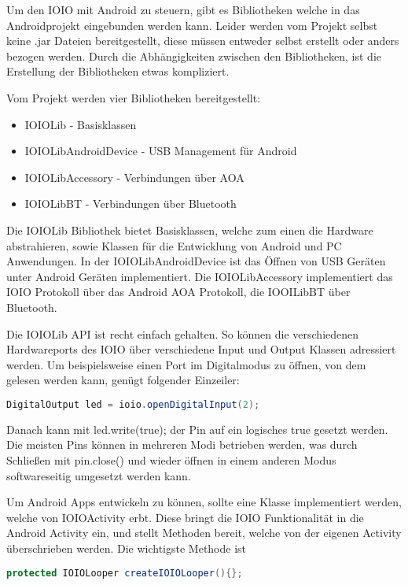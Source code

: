 \documentclass[12pt,journal,compsoc]{IEEEtran}
\begin{document}
Um den IOIO mit Android zu steuern, gibt es Bibliotheken welche in das Androidprojekt eingebunden werden kann.
Leider werden vom Projekt selbst keine .jar Dateien bereitgestellt, diese müssen entweder selbst erstellt oder anders bezogen werden. Durch die Abhängigkeiten zwischen den Bibliotheken, ist die Erstellung der Bibliotheken etwas kompliziert.

Vom Projekt werden vier Bibliotheken bereitgestellt:

\begin{itemize}
	\item IOIOLib - Basisklassen 
	\item IOIOLibAndroidDevice - USB Management für Android
	\item IOIOLibAccessory - Verbindungen über AOA
	\item IOIOLibBT - Verbindungen über Bluetooth
\end{itemize}

Die IOIOLib Bibliothek bietet Basisklassen, welche zum einen die Hardware abstrahieren, sowie Klassen für die Entwicklung von Android und PC Anwendungen.
In der IOIOLibAndroidDevice ist das Öffnen von USB Geräten unter Android Geräten implementiert.
Die IOIOLibAccessory implementiert das IOIO Protokoll über das Android AOA Protokoll, die IOOILibBT über Bluetooth.

Die IOIOLib API ist recht einfach gehalten.
So können die verschiedenen Hardwareports des IOIO über verschiedene Input und Output Klassen adressiert werden.
Um beispielsweise einen Port im Digitalmodus zu öffnen, von dem gelesen werden kann, genügt folgender Einzeiler:

\begin{lstlisting}[language=Java]
DigitalOutput led = ioio.openDigitalInput(2); 
\end{lstlisting}

Danach kann mit
led.write(true); 
der Pin auf ein logisches true gesetzt werden.
Die meisten Pins können in mehreren Modi betrieben werden, was durch Schließen mit pin.close() und wieder öffnen in einem anderen Modus softwareseitig umgesetzt werden kann. 

Um Android Apps entwickeln zu können, sollte eine Klasse implementiert werden, welche von IOIOActivity erbt.
Diese bringt die IOIO Funktionalität in die Android Activity ein, und stellt Methoden bereit, welche von der eigenen Activity überschrieben werden.
Die wichtigste Methode ist 

\begin{lstlisting}[language=Java]
protected IOIOLooper createIOIOLooper(){};
\end{lstlisting}
\end{document}

